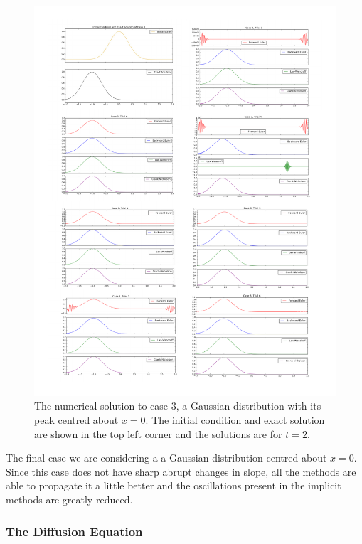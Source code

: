 \documentclass[twocolumn]{article}
\begin{document}
\begin{figure}
  \includegraphics[width=\textwidth]{case3}
  \caption{
    The numerical solution to case $3$, a Gaussian distribution with
    its peak centred about $x=0$. The initial condition and exact
    solution are shown in the top left corner and the solutions are
    for $t=2$.
  }
  \label{fig:case3}
\end{figure}

The final case we are considering a a Gaussian distribution centred
about $x=0$. Since this case does not have sharp abrupt changes in
slope, all the methods are able to propagate it a little better and
the oscillations present in the implicit methods are greatly reduced.

\subsubsection{The Diffusion Equation}
\end{document}

